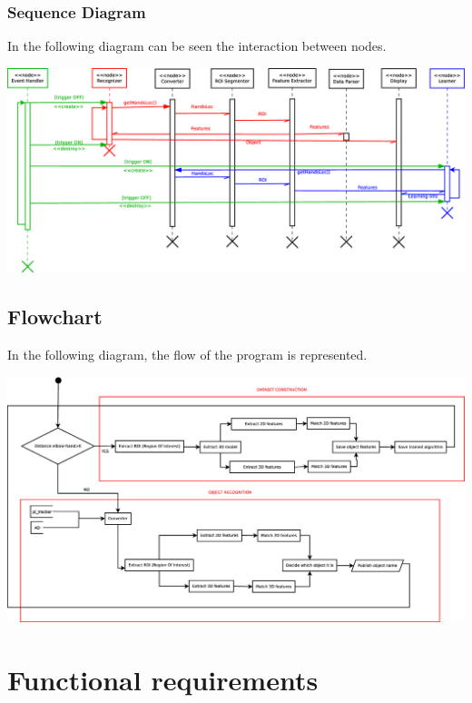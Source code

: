 \documentclass{article}
\begin{document}
\subsubsection{Sequence Diagram}
In the following diagram can be seen the interaction between nodes. 
\begin{center}
\includegraphics[scale=0.4]{../diagrams/images/sequence.eps}
\end{center}

\subsection{Flowchart}
In the following diagram, the flow of the program is represented. 
\begin{center}
\includegraphics[scale=0.35]{../diagrams/images/flowcharts.eps}
\end{center}





\section{Functional requirements}
\end{document}
